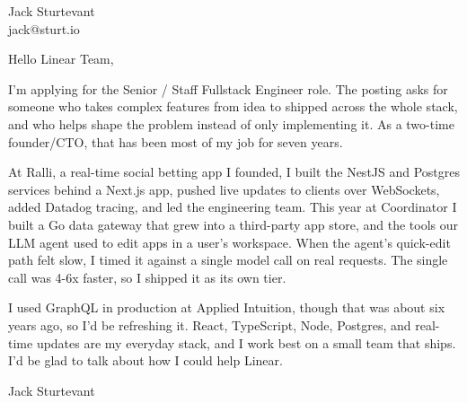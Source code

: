 \documentclass[11pt]{article}
\begin{document}
\raggedright

{\namefont\fontsize{20pt}{24pt}\selectfont Jack Sturtevant}\\[-0.3em]
jack@sturt.io

\vspace{1.2em}

Hello Linear Team,

I'm applying for the Senior / Staff Fullstack Engineer role. The posting asks for someone who takes complex features from idea to shipped across the whole stack, and who helps shape the problem instead of only implementing it. As a two-time founder/CTO, that has been most of my job for seven years.

At Ralli, a real-time social betting app I founded, I built the NestJS and Postgres services behind a Next.js app, pushed live updates to clients over WebSockets, added Datadog tracing, and led the engineering team. This year at Coordinator I built a Go data gateway that grew into a third-party app store, and the tools our LLM agent used to edit apps in a user's workspace. When the agent's quick-edit path felt slow, I timed it against a single model call on real requests. The single call was 4-6x faster, so I shipped it as its own tier.

I used GraphQL in production at Applied Intuition, though that was about six years ago, so I'd be refreshing it. React, TypeScript, Node, Postgres, and real-time updates are my everyday stack, and I work best on a small team that ships. I'd be glad to talk about how I could help Linear.

\vspace{0.6em}
Jack Sturtevant
\end{document}
